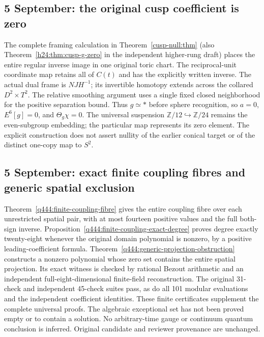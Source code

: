 \subsection*{5 September: the original cusp coefficient is zero}
The complete framing calculation in Theorem~\ref{cusp-null:thm}
(also Theorem~\ref{h24:thm:cusp-g-zero} in the independent higher-rung
draft) places the entire regular inverse image in one original toric
chart. The reciprocal-unit coordinate map retains all of $C(t)$ and
has the explicitly written inverse. The actual dual frame is $NJH^{-1}$;
its invertible homotopy extends across the collared $D^2\times T^2$.
The relative smoothing argument uses a single fixed closed neighborhood
for the positive separation bound. Thus $g\simeq *$ before sphere
recognition, so $a=0$, $E^6[g]=0$, and $\Theta_g\chi=0$.
The universal suspension $\mathbb Z/12\hookrightarrow\mathbb Z/24$
remains the even-subgroup embedding; the particular map represents its
zero element. The explicit construction does not assert nullity of
the earlier conical target or of the distinct one-copy map to $S^2$.

\subsection*{5 September: exact finite coupling fibres and generic spatial exclusion}
Theorem~\ref{q444:finite-coupling-fibre} gives the entire coupling
fibre over each unrestricted spatial pair, with at most fourteen
positive values and the full both-sign inverse.
Proposition~\ref{q444:finite-coupling-exact-degree} proves degree
exactly twenty-eight whenever the original domain polynomial is
nonzero, by a positive leading-coefficient formula.
Theorem~\ref{q444:generic-projection-obstruction} constructs a nonzero
polynomial whose zero set contains the entire spatial projection.
Its exact witness is checked by rational Bezout arithmetic and an
independent full-eight-dimensional finite-field reconstruction.
The original 31-check and independent 45-check suites pass, as do
all 101 modular evaluations and the independent coefficient identities.
These finite certificates supplement the complete universal proofs.
The algebraic exceptional set has not been proved empty or to contain
a solution. No arbitrary-time gauge or continuum quantum conclusion
is inferred. Original candidate and reviewer provenance are unchanged.

